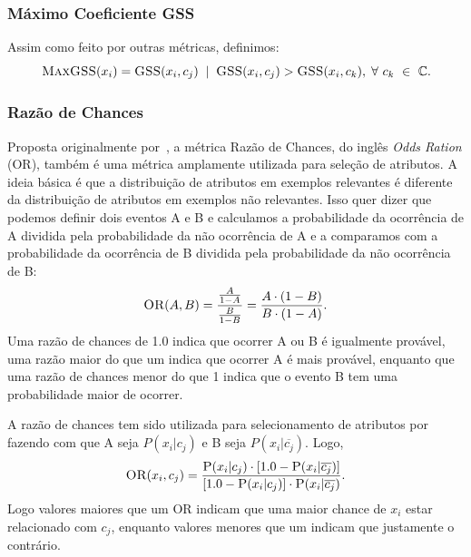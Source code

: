 \subsubsection{Máximo Coeficiente GSS}
\label{subsubsection::maxgss}

Assim como feito por outras métricas, definimos:
\begin{equation}\label{eqn::maxgss}
\textsc{MaxGSS}(x_i) = \textsc{GSS}(x_i,c_j) \; \; | \;\; \textsc{GSS}(x_i, c_j) > \textsc{GSS}(x_i, c_k), \; \forall\ c_k\ \in\ \mathbb{C}.
\end{equation}

\subsubsection{Razão de Chances}%
\label{subsubsection::or}

Proposta originalmente por~\cite{Rijsbergen79}, a métrica Razão de Chances, do inglês \textit{Odds Ration} (\textsc{OR}), também é uma métrica amplamente utilizada para seleção de atributos. A ideia básica é que a distribuição de atributos em exemplos relevantes é diferente da distribuição de atributos em exemplos não relevantes. Isso quer dizer que podemos definir dois eventos A e B e calculamos a probabilidade da ocorrência de A dividida pela probabilidade da não ocorrência de A e a comparamos com a probabilidade da ocorrência de B dividida pela probabilidade da não ocorrência de B:
\begin{equation}\label{eqn::or}
   \textsc{OR}(A, B) = \frac{\frac{A}{1-A}} {\frac{B}{1-B}} = \frac{ A \cdot ( 1 - B )} { B \cdot ( 1 - A ) } .
\end{equation}
Uma razão de chances de 1.0 indica que ocorrer A ou B é igualmente provável, uma razão maior do que um indica que ocorrer A é mais provável, enquanto que uma razão de chances menor do que 1 indica que o evento B tem uma probabilidade maior de ocorrer.

A razão de chances tem sido utilizada para selecionamento de atributos por \cite{Mladenic98} fazendo com que A seja $P(x_i|c_j)$ e B seja $P(x_i|\overline{c_j})$. Logo,
\begin{equation}\label{eqn::or}
   \textsc{OR}(x_i, c_j) = \frac{ \textsc{P}(x_i|c_j) \cdot [ 1.0 - \textsc{P}(x_i|\overline{c_j}) ] }{ [ 1.0 - \textsc{P}(x_i|c_j) ] \cdot \textsc{P}(x_i|\overline{c_j})}.
\end{equation}
Logo valores maiores que um \textsc{OR} indicam que uma maior chance de $x_i$ estar relacionado com $c_j$, enquanto valores menores que um indicam que justamente o contrário.

